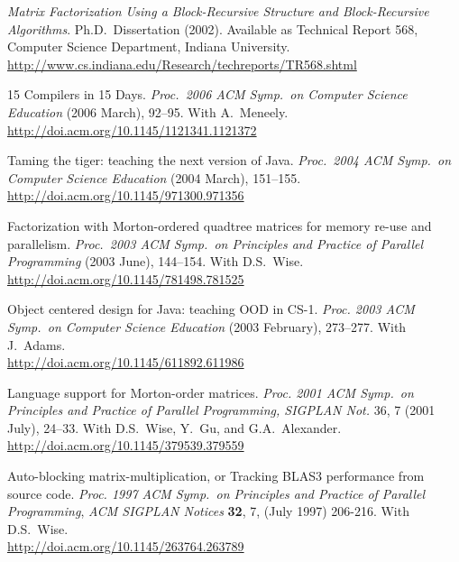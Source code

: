 \documentclass[ComputerScience]{vita}
\newcommand{\duphref}[1]{\href{#1}{#1}}
\begin{document}
\begin{vita}
\newpage



\begin{Publications}

  \item \textit{Matrix Factorization Using a Block-Recursive Structure and Block-Recursive Algorithms}.  Ph.D.\ Dissertation (2002).  Available as Technical Report 568, Computer Science Department, Indiana University. \\\duphref{http://www.cs.indiana.edu/Research/techreports/TR568.shtml}

  \begin{Papers at Refereed Conferences}
	
  \item 15 Compilers in 15 Days.  \textit{Proc.\ 2006 ACM Symp.\ on Computer Science Education} (2006 March), 92--95.  With A.~Meneely. \\\duphref{http://doi.acm.org/10.1145/1121341.1121372}

  \item Taming the tiger: teaching the next version of Java.  \textit{Proc.\ 2004 ACM Symp.\ on Computer Science Education} (2004 March), 151--155.  \\\duphref{http://doi.acm.org/10.1145/971300.971356}

  \item Factorization with Morton-ordered quadtree matrices for memory re-use and parallelism. \textit{Proc.\ 2003 ACM Symp.\ on Principles and Practice of Parallel Programming} (2003 June), 144--154.  With D.S.\ Wise.  \\\duphref{http://doi.acm.org/10.1145/781498.781525}

  \item Object centered design for Java: teaching OOD in CS-1. \textit{Proc. 2003 ACM Symp.\ on Computer Science Education} (2003 February), 273--277.  With J.\ Adams.  \\\duphref{http://doi.acm.org/10.1145/611892.611986}

  \item Language support for Morton-order matrices. \textit{Proc. 2001 ACM Symp.\ on Principles and Practice of Parallel Programming, SIGPLAN Not.} 36, 7 (2001 July), 24--33.  With D.S.\ Wise, Y.\ Gu, and G.A.\ Alexander.  \\\duphref{http://doi.acm.org/10.1145/379539.379559}

  \item Auto-blocking matrix-multiplication, or Tracking BLAS3 performance from source code. \textit{Proc. 1997 ACM Symp.\ on Principles and Practice of Parallel Programming\nocorr}, \textit{ACM SIGPLAN Notices} \textbf{32}, 7, (July 1997) 206-216.  With D.S.~Wise. \\\duphref{http://doi.acm.org/10.1145/263764.263789}


\end{Papers at Refereed Conferences}
\end{Publications}
\end{vita}
\end{document}
